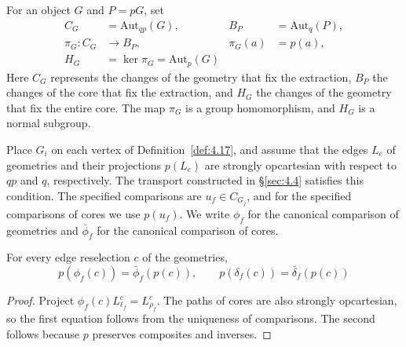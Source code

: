 \begin{definition}\label{def:4.30}

For an object $G$ and $P=pG$, set
\begin{equation*}
\begin{aligned}
C_G&=\mathrm{Aut}_{qp}(G),&
B_P&=\mathrm{Aut}_q(P),\\
\pi_G:C_G&\longrightarrow B_P,&
\pi_G(a)&=p(a),\\
H_G&=\ker\pi_G=\mathrm{Aut}_p(G)
\end{aligned}
\tag{4.36}\label{eq:4.36}
\end{equation*}
Here $C_G$ represents the changes of the geometry that fix the extraction, $B_P$ the
changes of the core that fix the extraction, and $H_G$ the changes of the geometry that
fix the entire core.
The map $\pi_G$ is a group homomorphism, and $H_G$ is a normal subgroup.

Place $G_i$ on each vertex of Definition~\ref{def:4.17}, and assume that the
edges $L_e$ of geometries and their projections $p(L_e)$ are strongly opcartesian
with respect to $qp$ and $q$, respectively.
The transport constructed in \S\ref{sec:4.4} satisfies this condition.
The specified comparisons are $u_f\in C_{G_j}$, and for the specified comparisons of
cores we use $p(u_f)$.
We write $\phi_f$ for the canonical comparison of geometries and $\bar\phi_f$ for the
canonical comparison of cores.

\end{definition}

\begin{proposition}\label{prop:4.31}

For every edge reselection $c$ of the geometries,
\begin{equation*}
p(\phi_f(c))=\bar\phi_f(p(c)),\qquad
p(\delta_f(c))=\bar\delta_f(p(c))
\tag{4.37}\label{eq:4.37}
\end{equation*}
\end{proposition}

\begin{proof}

Project $\phi_f(c)L_{\ell_f}^c=L_{\rho_f}^c$.
The paths of cores are also strongly opcartesian, so the first equation follows from the
uniqueness of comparisons.
The second follows because $p$ preserves composites and inverses.

\end{proof}

